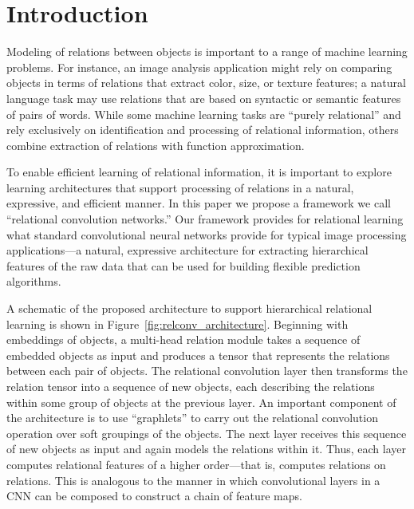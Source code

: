 \section{Introduction}\label{sec:intro}



Modeling of relations between objects is important to a range of machine learning problems. For instance, an image analysis application might rely on comparing objects in terms of relations that extract color, 
size, or texture features; a natural language task may use relations that are based on syntactic or semantic features of pairs of words. While some machine learning tasks are ``purely relational'' and rely exclusively on identification and processing of relational information, others combine extraction of relations with function approximation. 

To enable efficient learning of relational information, it is important to explore learning architectures that support processing of relations in a natural, expressive, and efficient manner. In this paper we propose a framework we call ``relational convolution networks.'' Our framework provides for relational learning what standard convolutional neural networks provide for typical image processing applications---a natural, expressive architecture for extracting hierarchical features of the raw data that can be used for building flexible prediction algorithms. 

A schematic of the proposed architecture to support hierarchical relational learning is shown in Figure~\ref{fig:relconv_architecture}. Beginning with embeddings of objects, a multi-head relation module takes a sequence of embedded objects as input and produces a tensor that represents the relations between each pair of objects. The relational convolution layer then transforms the relation tensor into a sequence of new objects, each describing the relations within some group of objects at the previous layer. 
An important component of the architecture is to use ``graphlets'' to 
carry out the relational convolution operation over soft groupings of the objects.
The next layer receives this sequence of new objects as input and again models the relations within it. Thus, each layer computes relational features of a higher order---that is, computes relations on relations. This is analogous to the manner in which convolutional layers in a CNN can be composed to construct a chain of feature maps.

